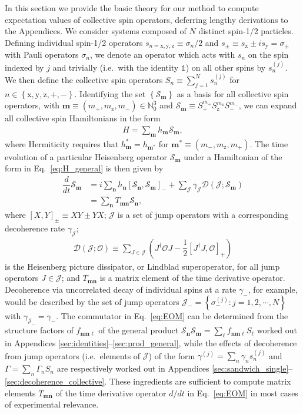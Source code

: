 \documentclass[pra,reprint,longbibliography]{revtex4-1}
\newcommand{\f}[2]{\dfrac{#1}{#2}} %
\newcommand{\p}[1]{\left(#1\right)} %
\renewcommand{\sp}[1]{\left[#1\right]} %
\renewcommand{\set}[1]{\left\{#1\right\}} %
\renewcommand{\v}{\bm} %
\newcommand{\D}{\mathcal{D}}
\newcommand{\J}{\mathcal{J}}
\renewcommand{\O}{\mathcal{O}}
\renewcommand{\S}{\mathcal{S}}
\newcommand{\N}{\mathbb{N}}
\newcommand{\z}{\text{z}}
\newcommand{\x}{\text{x}}
\newcommand{\y}{\text{y}}
\newcommand{\1}{\mathds{1}}
\begin{document}
In this section we provide the basic theory for our method to compute
expectation values of collective spin operators, deferring lengthy
derivations to the Appendices.  We consider systems composed of $N$
distinct spin-1/2 particles.  Defining individual spin-1/2 operators
$s_{n=\x,\y,\z}\equiv\sigma_n/2$ and
$s_\pm\equiv s_\x\pm is_\y=\sigma_\pm$ with Pauli operators
$\sigma_n$, we denote an operator which acts with $s_n$ on the spin
indexed by $j$ and trivially (i.e.~with the identity $\1$) on all
other spins by $s_n^{(j)}$.  We then define the collective spin
operators $S_n\equiv\sum_{j=1}^Ns_n^{(j)}$ for
$n\in\set{\x,\y,\z,+,-}$.  Identifying the set $\set{\S_{\v m}}$ as a
basis for all collective spin operators, with
$\v m\equiv\p{m_+,m_\z,m_-}\in\N_0^3$ and
$\S_{\v m}\equiv S_+^{m_+} S_\z^{m_\z} S_-^{m_-}$, we can expand all
collective spin Hamiltonians in the form
\begin{align}
  H = \sum_{\v m} h_{\v m} \S_{\v m},
  \label{eq:H_general}
\end{align}
where Hermiticity requires that $h_{\v m}^*=h_{\v m^*}$ for
$\v m^*\equiv\p{m_-,m_\z,m_+}$.  The time evolution of a particular
Heisenberg operator $\S_{\v m}$ under a Hamiltonian of the form in
Eq.~\eqref{eq:H_general} is then given by
\begin{align}
  \f{d}{dt}\S_{\v m}
  &= i\sum_{\v n}h_{\v n}\sp{\S_{\v n},\S_{\v m}}_-
  + \sum_\J \gamma_\J \D\p{\J;\S_{\v m}} \\
  &= \sum_{\v n} T_{\v m\v n} \S_{\v n},
  \label{eq:EOM}
\end{align}
where $\sp{X,Y}_\pm\equiv XY\pm YX$; $\J$ is a set of jump operators
with a corresponding decoherence rate $\gamma_\J$;
\begin{align}
  \D\p{\J;\O}
  \equiv \sum_{J\in\J} \p{J^\dag \O J - \f12\sp{J^\dag J,\O}_+}
\end{align}
is the Heisenberg picture dissipator, or Lindblad superoperator, for
all jump operators $J\in\J$; and $T_{\v m\v n}$ is a matrix element of
the time derivative operator.  Decoherence via uncorrelated decay of
individual spins at a rate $\gamma_-$, for example, would be described
by the set of jump operators
$\J_-=\set{\sigma_-^{(j)}:j=1,2,\cdots,N}$ with
$\gamma_{\J_-}=\gamma_-$.  The commutator in Eq.~\eqref{eq:EOM} can be
determined from the structure factors of $f_{\v n\v m\v\ell}$ of the
general product
$\S_{\v n}\S_{\v m}=\sum_{\v\ell}f_{\v n\v m\v\ell}S_{\v\ell}$ worked
out in Appendices \ref{sec:identities}--\ref{sec:prod_general}, while
the effects of decoherence from jump operators (i.e.~elements of $\J$)
of the form $\gamma^{(j)}=\sum_n\gamma_ns_n^{(j)}$ and
$\Gamma=\sum_n\Gamma_nS_n$ are respectively worked out in Appendices
\ref{sec:sandwich_single}--\ref{sec:decoherence_collective}.  These
ingredients are sufficient to compute matrix elements $T_{\v m\v n}$
of the time derivative operator $d/dt$ in Eq.~\eqref{eq:EOM} in most
cases of experimental relevance.
\end{document}

